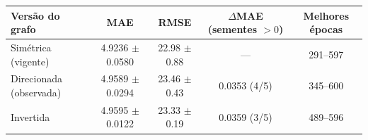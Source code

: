 \begin{tabular}{lcccc}\toprule
Versão do grafo & MAE & RMSE & $\Delta$MAE (sementes $>0$) & Melhores épocas\\\midrule
Simétrica (vigente) & \num{4.9236} $\pm$ \num{0.0580} & \num{22.98} $\pm$ \num{0.88} & --- & \num{291}--\num{597}\\
Direcionada (observada) & \num{4.9589} $\pm$ \num{0.0294} & \num{23.46} $\pm$ \num{0.43} & \num{+0.0353} (4/5) & \num{345}--\num{600}\\
Invertida & \num{4.9595} $\pm$ \num{0.0122} & \num{23.33} $\pm$ \num{0.19} & \num{+0.0359} (3/5) & \num{489}--\num{596}\\
\bottomrule\end{tabular}
